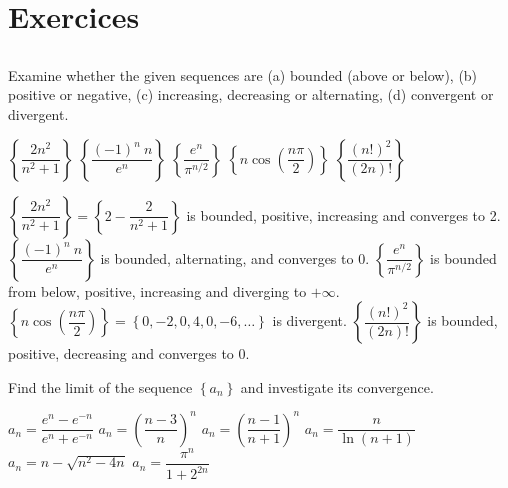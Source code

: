 \newpage
\section{Exercices}
\renewcommand{\ExerciseListName}{Assignment}


\subsection*{}

\begin{Exercise} Examine whether the given sequences are (a) bounded (above or below), (b) positive or negative, (c) increasing, decreasing or alternating, (d) convergent or divergent.
\begin{multicols}{2}
    \Question[difficulty = 1] $\left\{ \dfrac{2n^2}{n^2+1}\right\}$ 
    \Question[difficulty = 2] $\left\{ \dfrac{(-1)^n \ n}{e^n}\right\}$ 
    \Question[difficulty = 2] $\left\{ \dfrac{e^n}{\pi^{n/2}}\right\}$  
    \Question[difficulty = 2] $\left\{ n \cos \left(\dfrac{n \pi}{2} \right) \right\}$
    \Question[difficulty = 3] $\left\{ \dfrac{(n!)^2}{(2n)!}\right\}$ 
    \EndCurrentQuestion
\end{multicols}
\end{Exercise}

\begin{Answer}

    \Question $\left\{ \dfrac{2n^2}{n^2+1}\right\} = \left\{2- \dfrac{2}{n^2+1}\right\}$ is bounded, positive, increasing and converges to 2. 
    \Question $\left\{ \dfrac{(-1)^n \ n}{e^n}\right\}$ is bounded, alternating, and converges to 0.
    \Question $\left\{ \dfrac{e^n}{\pi^{n/2}}\right\}$ is bounded from below, positive, increasing and diverging to $+\infty$.
    \Question $\left\{ n \cos \left(\dfrac{n \pi}{2} \right) \right\} = \left\{ 0, -2, 0, 4,0,-6, \ldots \right\}$ is divergent. 
    \Question $\left\{ \dfrac{(n!)^2}{(2n)!}\right\}$ is bounded, positive, decreasing and converges to 0.
    
\end{Answer}

\begin{Exercise} Find the limit of the sequence $\left\{a_n\right\}$ and investigate its convergence. 
\begin{multicols}{2}
    \Question[difficulty = 2] $a_n = \dfrac{e^n - e^{-n}}{e^n + e^{-n}}$ 
    \Question[difficulty = 2] $a_n = \left(\dfrac{n-3}{n}\right)^n$  
    \Question[difficulty = 3] $a_n = \left(\dfrac{n-1}{n+1}\right)^n$ 
    \Question[difficulty = 1] $a_n = \dfrac{n}{\ln(n+1)}$ 
    \Question[difficulty = 2] $a_n = n - \sqrt{n^2-4n}$ 
    \Question[difficulty = 3] $a_n = \dfrac{\pi^n}{1+2^{2n}}$
    \EndCurrentQuestion
\end{multicols}
\end{Exercise}

